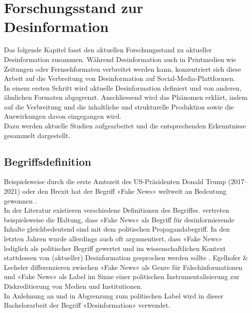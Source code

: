 \documentclass[12pt,a4paper]{article}        %
\begin{document}
\pagebreak
\section{Forschungsstand zur Desinformation}
\label{sec:theory}
Das folgende Kapitel fasst den aktuellen Forschungsstand zu aktueller Desinformation zusammen. Während Desinformation auch in Printmedien wie Zeitungen oder Fernsehformaten verbreitet werden kann, konzentriert sich diese Arbeit auf die Verbreitung von Desinformation auf Social-Media-Plattformen.\\
In einem ersten Schritt wird aktuelle Desinformation definiert und von anderen, ähnlichen Formaten abgegrenzt. Anschliessend wird das Phänomen erklärt, indem auf die Verbreitung und die inhaltliche und strukturelle Produktion sowie die Auswirkungen davon eingegangen wird. \\
Dazu werden aktuelle Studien aufgearbeitet und die entsprechenden Erkenntnisse gesammelt dargestellt.

\subsection{Begriffsdefinition}
\label{theory_definition}
Beispielsweise durch die erste Amtszeit des US-Präsidenten Donald Trump (2017–2021) oder den Brexit hat der Begriff «Fake News» weltweit an Bedeutung gewonnen \parencites[1f]{hohlfeld_schlechte_2020}[1]{marx_fake_2020}. \\
In der Literatur existieren verschiedene Definitionen des Begriffes. \textcite[246f]{hohlfeld_schlechte_2020} vertreten beispielsweise die Haltung, dass «Fake News» als Begriff für desinformierende Inhalte gleichbedeutend sind mit dem politischen Propagandabegriff. In den letzten Jahren wurde allerdings auch oft argumentiert, dass «Fake News» lediglich als politischer Begriff gewertet und im wissenschaftlichen Kontext stattdessen von (aktueller) Desinformation gesprochen werden sollte \parencites[3]{bontridder_role_2021}{habgood-coote_stop_2019}[148]{marx_fake_2020}. Egelhofer \& Lecheler \parencite[zit.\ nach][148]{marx_fake_2020} differenzieren zwischen «Fake News» als Genre für Falschinformationen und «Fake News» als Label im Sinne einer politischen Instrumentalisierung zur Diskreditierung von Medien und Institutionen.\\
In Anlehnung an \textcite{marx_fake_2020} und in Abgrenzung zum politischen Label wird in dieser Bachelorarbeit der Begriff «Desinformation» verwendet.
\end{document}
